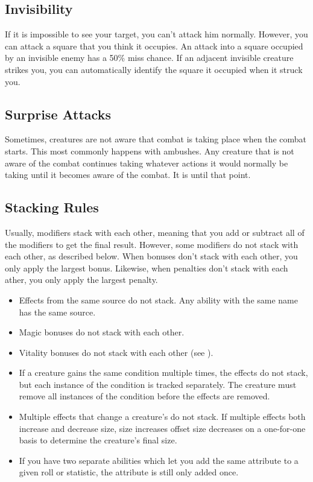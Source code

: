     \subsection{Invisibility}\label{Invisibility}
        If it is impossible to see your target, you can't attack him normally. However, you can attack a square that you think it occupies. An attack into a square occupied by an invisible enemy has a 50\% miss chance. If an adjacent invisible creature strikes you, you can automatically identify the square it occupied when it struck you.

    \subsection{Surprise Attacks}\label{Surprise Attacks}
        Sometimes, creatures are not aware that combat is taking place when the combat starts. This most commonly happens with ambushes. Any creature that is not aware of the combat continues taking whatever actions it would normally be taking until it becomes aware of the combat. It is \unaware until that point.

    \subsection{Stacking Rules}\label{Stacking Rules}
        Usually, modifiers stack with each other, meaning that you add or subtract all of the modifiers to get the final result.
        However, some modifiers do not stack with each other, as described below.
        When bonuses don't stack with each other, you only apply the largest bonus.
        Likewise, when penalties don't stack with each ather, you only apply the largest penalty.


        \begin{itemize}
            \item Effects from the same source do not stack. Any ability with the same name has the same source.
            \item Magic bonuses do not stack with each other.
            \item Vitality bonuses do not stack with each other (see ).
            \item If a creature gains the same condition multiple times, the effects do not stack, but each instance of the condition is tracked separately.
                The creature must remove all instances of the condition before the effects are removed.
            \item Multiple effects that change a creature's  do not stack.
                If multiple effects both increase and decrease size, size increases offset size decreases on a one-for-one basis to determine the creature's final size.
            \item If you have two separate abilities which let you add the same attribute to a given roll or statistic, the attribute is still only added once.
        \end{itemize}


